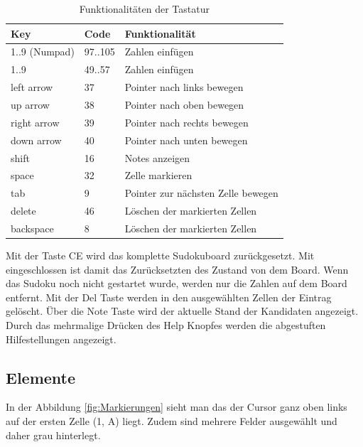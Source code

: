 \begin{table}[H]
	\centering
	\begin{tabular}{lll}
		\hline
		Key         & Code    & Funktionalität                     \\ \hline
		1..9 (Numpad)       & 97..105 & Zahlen einfügen                    \\
		1..9        & 49..57  & Zahlen einfügen                    \\
		left arrow  & 37      & Pointer nach links bewegen         \\
		up arrow    & 38      & Pointer nach oben bewegen          \\
		right arrow & 39      & Pointer nach rechts bewegen        \\
		down arrow  & 40      & Pointer nach unten bewegen         \\
		shift       & 16      & Notes anzeigen                     \\
		space       & 32      & Zelle markieren                    \\
		tab         & 9       & Pointer zur nächsten Zelle bewegen \\
		delete      & 46      & Löschen der markierten Zellen      \\
		backspace   & 8       & Löschen der markierten Zellen      \\ \hline
	\end{tabular}%
	\caption{Funktionalitäten der Tastatur}
	\label{tab:tastatur}
\end{table}

Mit der Taste \ac{CE} wird das komplette Sudokuboard zurückgesetzt. Mit eingeschlossen ist damit das Zurücksetzten des Zustand von dem Board. Wenn das Sudoku noch nicht gestartet wurde, werden nur die Zahlen auf dem Board entfernt. Mit der Del Taste werden in den ausgewählten Zellen der Eintrag gelöscht. Über die Note Taste wird der aktuelle Stand der Kandidaten angezeigt. Durch das mehrmalige Drücken des Help Knopfes werden die abgestuften Hilfestellungen angezeigt.

\subsection{Elemente}

In der Abbildung \ref{fig:Markierungen} sieht man das der Cursor ganz oben links auf der ersten Zelle (1, A) liegt. Zudem sind mehrere Felder ausgewählt und daher grau hinterlegt.

